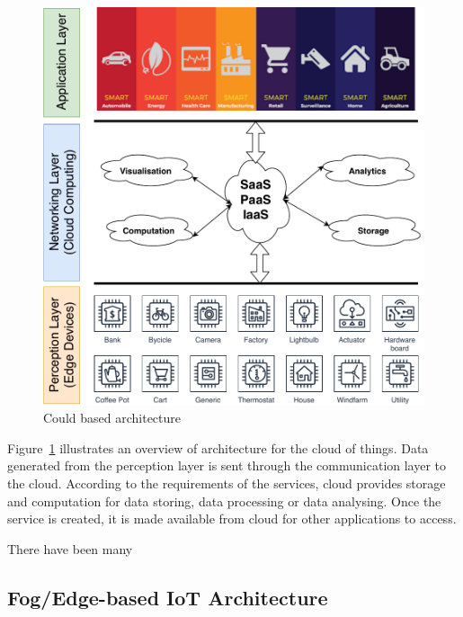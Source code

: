 \begin{figure}[ht!]
    \centering
    \includegraphics[scale=.65]{Pictures/c2/2-3-Cloud-based-architecture.pdf}
    \caption{Could based architecture}
    \label{fig:2.3.2-cloudIoT}
\end{figure}

Figure~\ref{fig:2.3.2-cloudIoT} illustrates an overview of architecture for the cloud of things. 
Data generated from the perception layer is sent through the communication layer to the cloud.
According to the requirements of the services, cloud provides storage and computation for data storing, data processing or data analysing. 
Once the service is created, it is made available from cloud for other applications to access.

There have been many 


\subsection{Fog/Edge-based IoT Architecture}

